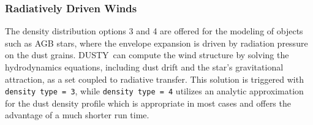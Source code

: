 \documentclass[12pt]{article} \usepackage{epsf}
\def\D  {{\sf DUSTY}}
\begin{document}
\subsubsection          {Radiatively Driven Winds}
\label{winds}

The density distribution options 3 and 4 are offered for the modeling of
objects such as AGB stars, where the envelope expansion is driven by radiation
pressure on the dust grains. \D\ can compute the wind structure by solving the
hydrodynamics equations, including dust drift and the star's gravitational
attraction, as a set coupled to radiative transfer.  This solution is triggered
with {\tt density type = 3}, while {\tt density type = 4} utilizes an analytic
approximation for the dust density profile which is appropriate in most cases
and offers the advantage of a much shorter run time.
\end{document}
